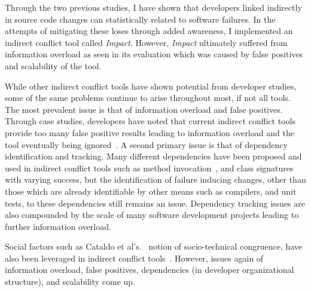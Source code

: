 \label{chapter:exploration}

Through the two previous studies, I have shown that developers linked indirectly in source code changes can statistically
related to software failures. In the attempts of mitigating these loses through added awareness, I implemented
an indirect conflict tool called \textit{Impact}. However, \textit{Impact} ultimately suffered from information
overload as seen in its evaluation which was caused by false positives and scalability of the tool.

While other indirect conflict tools have shown potential from developer studies, some of the same problems continue
to arise throughout most, if not all tools. The most prevalent issue is that of information
overload and false positives. Through case studies, developers have noted that current indirect conflict tools provide too many 
false positive results leading to information overload and the tool eventually being
ignored~\cite{Sarma:2007:TSA, Servant:2010:CPI}. A second primary issue is that of dependency identification and
tracking. Many different dependencies have been proposed and used in indirect conflict tools such as method 
invocation~\cite{Trainer:2005:BGT}, and class signatures~\cite{Sarma:2007:TSA} with varying success, but the 
identification of failure inducing changes, other than those which are already identifiable by other means such
as compilers, and unit tests, to these dependencies still remains an issue. Dependency tracking issues are
also compounded by the scale of many software development projects leading to further information overload.

Social factors such as Cataldo et al's.~\cite{Cataldo:2006:ICR} notion of socio-technical
congruence, have also been leveraged in indirect conflict tools~\cite{Kwan:2011:ESC, Begel:2010:CDE, Borici:2012:CHA}.
However, issues again of information overload, false positives, dependencies (in developer organizational structure), and scalability 
come up.

